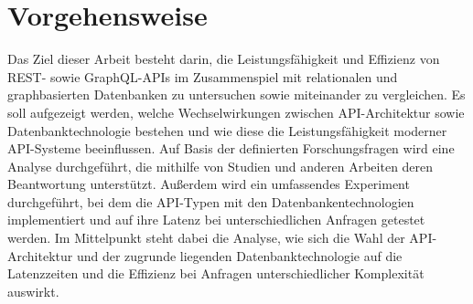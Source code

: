 \section{Vorgehensweise} %
\label{sec:vorgehensweise}
Das Ziel dieser Arbeit besteht darin, die Leistungsfähigkeit und Effizienz von REST- sowie GraphQL-APIs im Zusammenspiel mit relationalen und graphbasierten Datenbanken zu untersuchen sowie miteinander zu vergleichen. Es soll aufgezeigt werden, welche Wechselwirkungen zwischen API-Architektur sowie Datenbanktechnologie bestehen und wie diese die Leistungsfähigkeit moderner API-Systeme beeinflussen. Auf Basis der definierten Forschungsfragen wird eine Analyse durchgeführt, die mithilfe von Studien und anderen Arbeiten deren Beantwortung unterstützt. Außerdem wird ein umfassendes Experiment durchgeführt, bei dem die API-Typen mit den Datenbankentechnologien implementiert und auf ihre Latenz bei unterschiedlichen Anfragen getestet werden. Im Mittelpunkt steht dabei die Analyse, wie sich die Wahl der API-Architektur und der zugrunde liegenden Datenbanktechnologie auf die Latenzzeiten und die Effizienz bei Anfragen unterschiedlicher Komplexität auswirkt. 
